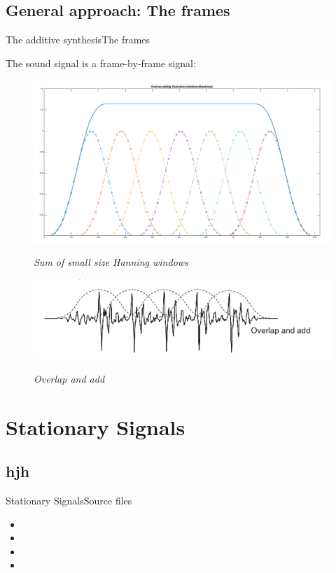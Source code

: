 \documentclass[10pt]{beamer}
\begin{document}
\subsection{General approach: The frames}
\begin{frame}{The additive synthesis}{The frames}

The sound signal is  a frame-by-frame signal: \\

\begin{figure}

	{\includegraphics[scale=0.3]{overlap2.png}}
	\caption{\it Sum of small size Hanning windows}
\end{figure}
\begin{figure}
	{\includegraphics[scale=0.25]{overlap1.png}}
	\caption{\it Overlap and add}
\end{figure}
\end{frame}
\section{Stationary Signals}
\subsection{hjh}
\begin{frame}{Stationary Signals}{Source files}

\begin{block}{}

  \begin{itemize}
    \item {\tt }
    \item {\tt }
    \item {\tt }
    \item {\tt }
  \end{itemize}
\end{block}
\end{frame}
\end{document}
